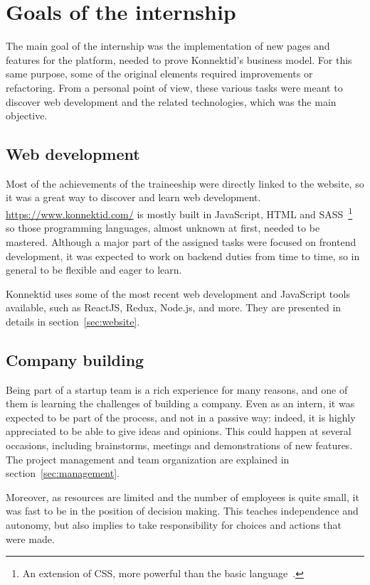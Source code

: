 \section{Goals of the internship}
\label{sec:goals}

The main goal of the internship was the implementation of new pages and features for the platform, needed to prove Konnektid's business model.
For this same purpose, some of the original elements required improvements or refactoring.
From a personal point of view, these various tasks were meant to discover web development and the related technologies, which was the main objective.

\subsection{Web development}
\label{ssec:web}

Most of the achievements of the traineeship were directly linked to the website, so it was a great way to discover and learn web development.
\url{https://www.konnektid.com/} is mostly built in JavaScript, HTML and SASS~\footnote{An extension of CSS, more powerful than the basic language~\cite{sass}.}
so those programming languages, almost unknown at first, needed to be mastered.
Although a major part of the assigned tasks were focused on frontend development,
it was expected to work on backend duties from time to time, so in general to be flexible and eager to learn.

Konnektid uses some of the most recent web development and JavaScript tools available, such as ReactJS, Redux, Node.js, and more.
They are presented in details in {\sc section}~\ref{sec:website}.

\subsection{Company building}
\label{ssec:companyBuilding}

Being part of a startup team is a rich experience for many reasons, and one of them is learning the challenges of building a company.
Even as an intern, it was expected to be part of the process, and not in a passive way: indeed, it is highly appreciated to be able to give ideas and opinions.
This could happen at several occasions, including brainstorms, meetings and demonstrations of new features.
The project management and team organization are explained in {\sc section}~\ref{sec:management}.

Moreover, as resources are limited and the number of employees is quite small, it was fast to be in the position of decision making.
This teaches independence and autonomy, but also implies to take responsibility for choices and actions that were made.
